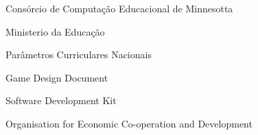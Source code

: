 \item[ MECC ]			Consórcio de Computação Educacional de Minnesotta
\item[ MEC ]			Ministerio da Educação
\item[ PCN ]            Parâmetros Curriculares Nacionais
\item[ GDD ]            Game Design Document
\item[ SDK ]            Software Development Kit
\item[ OCDE ]           Organisation for Economic Co-operation and Development

